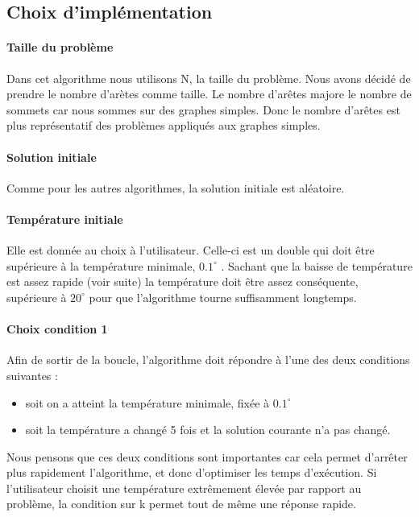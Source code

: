 \documentclass[12pt]{article}
\begin{document}
\subsection{Choix d'implémentation}

\paragraph{Taille du problème}
Dans cet algorithme nous utilisons N, la taille du problème. Nous avons décidé de prendre le nombre d’arètes comme taille. Le nombre d’arêtes majore le nombre de sommets car nous sommes sur des graphes simples. Donc le nombre d’arêtes est plus représentatif des problèmes appliqués aux graphes simples.

\paragraph{Solution initiale} Comme pour les autres algorithmes, la solution initiale est aléatoire.

\paragraph{Température initiale} Elle est donnée au choix à l’utilisateur. Celle-ci est un double qui doit être supérieure à la température minimale, $0.1^\circ$ . Sachant que la baisse de température est assez rapide (voir suite) la température doit être assez conséquente, supérieure à $20^\circ$ pour que l’algorithme tourne suffisamment longtemps.

\paragraph{Choix condition 1} Afin de sortir de la boucle, l’algorithme doit répondre à l’une des deux conditions suivantes :
	\begin{itemize}
    \item soit on a atteint la température minimale, fixée à $0.1^\circ$
    \item soit la température a changé 5 fois et la solution courante n’a pas changé.
    \end{itemize}

Nous pensons que ces deux conditions sont importantes car cela permet d'arrêter plus rapidement l'algorithme, et donc d’optimiser les temps d’exécution. Si l’utilisateur choisit une température extrêmement élevée par rapport au problème, la condition sur k permet tout de même une réponse rapide.
\end{document}
